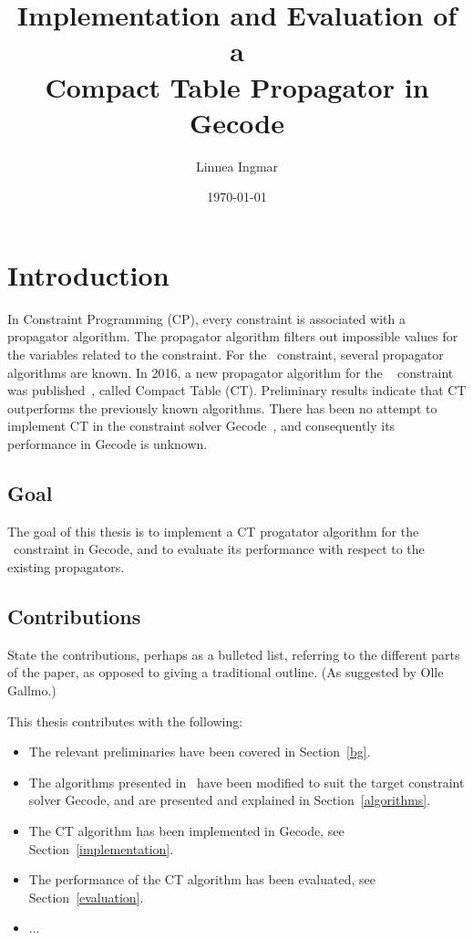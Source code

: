 \documentclass[a4paper,11pt]{article}
\title{\textbf{Implementation and Evaluation of a\\
    Compact Table Propagator in Gecode
  }
}
\author{Linnea Ingmar} %
\date{\today}
\newcommand{\Todo}[1]{{\color{blue}#1}}
\newcommand{\Chapref}[1]{Section~\ref{#1}}
\newcommand{\Table}{\Constraint{Table}~}
\newcommand{\CTpaper}[0]{DBLP:conf/cp/DemeulenaereHLP16}
\numberwithin{equation}{section}
\begin{document}
\maketitle

\tableofcontents

\newpage

\section{Introduction}
\label{intro}

In Constraint Programming (CP), every constraint is associated with a propagator
algorithm. The propagator algorithm filters out impossible values for the variables
related to the constraint. For the \Table constraint, several propagator
algorithms are known. In 2016, a new propagator algorithm for the \Table
constraint was published~\cite{\CTpaper}, called Compact Table (CT).
Preliminary results indicate that CT outperforms the previously known algorithms.
There has been no attempt to implement CT in the constraint solver Gecode~\cite{Gecode}, and consequently its performance in Gecode is unknown.

\subsection{Goal}
\label{intro:goal}
The goal of this thesis is to implement a CT progatator
algorithm for the \Table constraint in Gecode,
and to evaluate its performance with respect to the existing propagators.

\subsection{Contributions}
\label{intro:contributions}

\Todo{State the contributions, perhaps as a bulleted list, referring to the different
parts of the paper, as opposed to giving a traditional outline. (As suggested
by Olle Gallmo.)}

This thesis contributes with the following:

\begin{itemize}
  \item The relevant preliminaries have been covered in \Chapref{bg}.
  \item The algorithms presented in~\cite{DBLP:conf/cp/DemeulenaereHLP16} have been modified to suit the
    target constraint solver Gecode, and are presented and explained in 
    \Chapref{algorithms}.
  \item The CT algorithm has been implemented in Gecode, see \Chapref{implementation}.
  \item The performance of the CT algorithm has been evaluated, see \Chapref{evaluation}.
  \item ...
\end{itemize}
\end{document}
